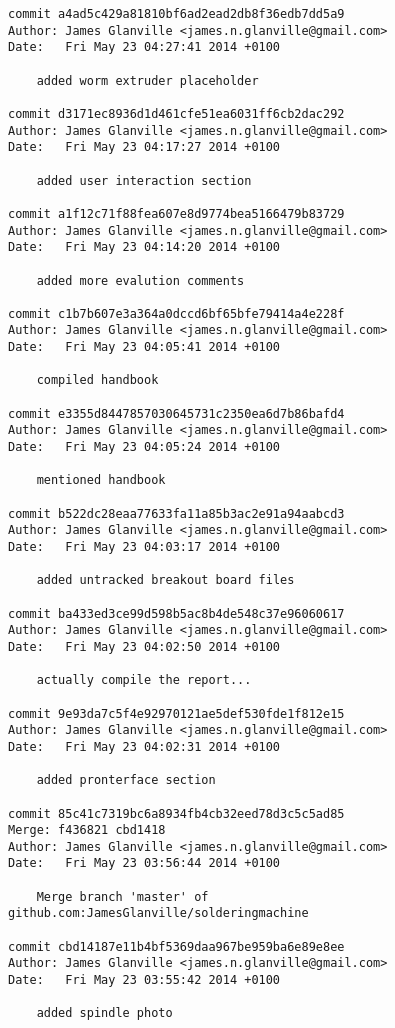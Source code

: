 \documentclass[a4paper,11pt]{article}  %
\begin{document}
\begin{lstlisting}[frame=single]
commit a4ad5c429a81810bf6ad2ead2db8f36edb7dd5a9
Author: James Glanville <james.n.glanville@gmail.com>
Date:   Fri May 23 04:27:41 2014 +0100

    added worm extruder placeholder

commit d3171ec8936d1d461cfe51ea6031ff6cb2dac292
Author: James Glanville <james.n.glanville@gmail.com>
Date:   Fri May 23 04:17:27 2014 +0100

    added user interaction section

commit a1f12c71f88fea607e8d9774bea5166479b83729
Author: James Glanville <james.n.glanville@gmail.com>
Date:   Fri May 23 04:14:20 2014 +0100

    added more evalution comments

commit c1b7b607e3a364a0dccd6bf65bfe79414a4e228f
Author: James Glanville <james.n.glanville@gmail.com>
Date:   Fri May 23 04:05:41 2014 +0100

    compiled handbook

commit e3355d8447857030645731c2350ea6d7b86bafd4
Author: James Glanville <james.n.glanville@gmail.com>
Date:   Fri May 23 04:05:24 2014 +0100

    mentioned handbook

commit b522dc28eaa77633fa11a85b3ac2e91a94aabcd3
Author: James Glanville <james.n.glanville@gmail.com>
Date:   Fri May 23 04:03:17 2014 +0100

    added untracked breakout board files

commit ba433ed3ce99d598b5ac8b4de548c37e96060617
Author: James Glanville <james.n.glanville@gmail.com>
Date:   Fri May 23 04:02:50 2014 +0100

    actually compile the report...

commit 9e93da7c5f4e92970121ae5def530fde1f812e15
Author: James Glanville <james.n.glanville@gmail.com>
Date:   Fri May 23 04:02:31 2014 +0100

    added pronterface section

commit 85c41c7319bc6a8934fb4cb32eed78d3c5c5ad85
Merge: f436821 cbd1418
Author: James Glanville <james.n.glanville@gmail.com>
Date:   Fri May 23 03:56:44 2014 +0100

    Merge branch 'master' of github.com:JamesGlanville/solderingmachine

commit cbd14187e11b4bf5369daa967be959ba6e89e8ee
Author: James Glanville <james.n.glanville@gmail.com>
Date:   Fri May 23 03:55:42 2014 +0100

    added spindle photo


\end{lstlisting}
\end{document}
